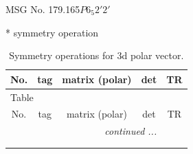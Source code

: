 \documentclass[fleqn,8pt]{jsarticle}
\begin{document}
\setcounter{MaxMatrixCols}{32}

\renewcommand{\tablename}{Table~}
\renewcommand{\figurename}{Figure~}
\begin{center}
\LARGE
MSG No. 179.165\quad$P6_{5}2'2'$
\end{center}
* symmetry operation
\renewcommand{\arraystretch}{1.3}
\begin{longtable}{ccccc}
\caption{Symmetry operations for 3d polar vector.}
 \\
 \hline \hline
No. & tag & matrix (polar) & det & TR \\ \hline \endfirsthead

\multicolumn{4}{l}{\tablename\ \thetable{}} \\
 \hline \hline
No. & tag & matrix (polar) & det & TR \\ \hline \endhead

 \hline \hline
\multicolumn{4}{r}{\footnotesize\it continued ...} \\ \endfoot

 \hline \hline
\multicolumn{4}{r}{} \\ \endlastfoot


\end{longtable}
\end{document}
